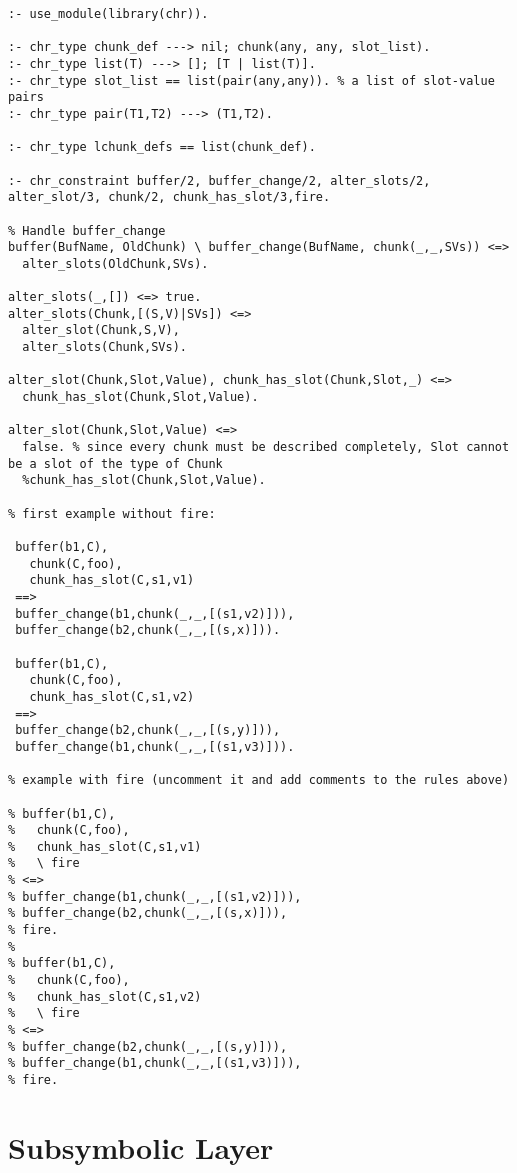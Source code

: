 \begin{lstlisting}[caption={Rule order example}]
:- use_module(library(chr)).

:- chr_type chunk_def ---> nil; chunk(any, any, slot_list).
:- chr_type list(T) ---> []; [T | list(T)].
:- chr_type slot_list == list(pair(any,any)). % a list of slot-value pairs
:- chr_type pair(T1,T2) ---> (T1,T2).

:- chr_type lchunk_defs == list(chunk_def).

:- chr_constraint buffer/2, buffer_change/2, alter_slots/2, alter_slot/3, chunk/2, chunk_has_slot/3,fire.

% Handle buffer_change
buffer(BufName, OldChunk) \ buffer_change(BufName, chunk(_,_,SVs)) <=>
  alter_slots(OldChunk,SVs).

alter_slots(_,[]) <=> true.
alter_slots(Chunk,[(S,V)|SVs]) <=> 
  alter_slot(Chunk,S,V),
  alter_slots(Chunk,SVs).
  
alter_slot(Chunk,Slot,Value), chunk_has_slot(Chunk,Slot,_) <=>
  chunk_has_slot(Chunk,Slot,Value).
  
alter_slot(Chunk,Slot,Value) <=>
  false. % since every chunk must be described completely, Slot cannot be a slot of the type of Chunk
  %chunk_has_slot(Chunk,Slot,Value).  

% first example without fire: 
  
 buffer(b1,C),
   chunk(C,foo),
   chunk_has_slot(C,s1,v1)
 ==>
 buffer_change(b1,chunk(_,_,[(s1,v2)])),
 buffer_change(b2,chunk(_,_,[(s,x)])).
 
 buffer(b1,C),
   chunk(C,foo),
   chunk_has_slot(C,s1,v2)
 ==>
 buffer_change(b2,chunk(_,_,[(s,y)])),
 buffer_change(b1,chunk(_,_,[(s1,v3)])).

% example with fire (uncomment it and add comments to the rules above) 
 
% buffer(b1,C),
%   chunk(C,foo),
%   chunk_has_slot(C,s1,v1)
%   \ fire
% <=>
% buffer_change(b1,chunk(_,_,[(s1,v2)])),
% buffer_change(b2,chunk(_,_,[(s,x)])),
% fire.
% 
% buffer(b1,C),
%   chunk(C,foo),
%   chunk_has_slot(C,s1,v2)
%   \ fire
% <=>
% buffer_change(b2,chunk(_,_,[(s,y)])),
% buffer_change(b1,chunk(_,_,[(s1,v3)])),
% fire.
\end{lstlisting}
\flushbottom

\section{Subsymbolic Layer}
\label{app:ex:subsymbolic_layer}

